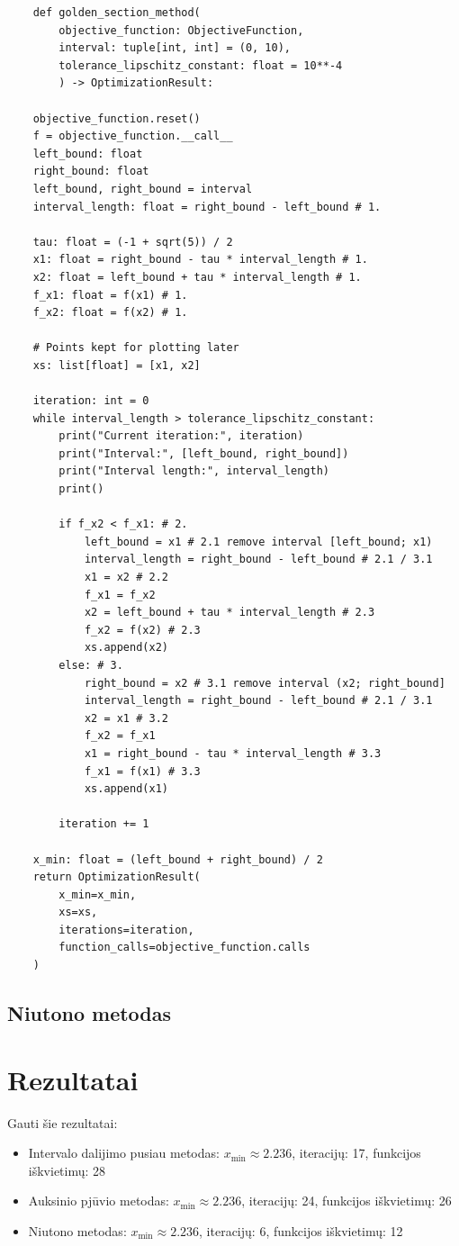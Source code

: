 \documentclass[lithuanian,a4paper,12pt]{article}
\begin{document}
\begin{verbatim}
    def golden_section_method(
        objective_function: ObjectiveFunction, 
        interval: tuple[int, int] = (0, 10), 
        tolerance_lipschitz_constant: float = 10**-4
        ) -> OptimizationResult:
    
    objective_function.reset()
    f = objective_function.__call__
    left_bound: float 
    right_bound: float 
    left_bound, right_bound = interval
    interval_length: float = right_bound - left_bound # 1.
    
    tau: float = (-1 + sqrt(5)) / 2
    x1: float = right_bound - tau * interval_length # 1.
    x2: float = left_bound + tau * interval_length # 1.
    f_x1: float = f(x1) # 1.
    f_x2: float = f(x2) # 1.

    # Points kept for plotting later
    xs: list[float] = [x1, x2]
    
    iteration: int = 0
    while interval_length > tolerance_lipschitz_constant:
        print("Current iteration:", iteration)
        print("Interval:", [left_bound, right_bound])
        print("Interval length:", interval_length)
        print()
        
        if f_x2 < f_x1: # 2.
            left_bound = x1 # 2.1 remove interval [left_bound; x1)
            interval_length = right_bound - left_bound # 2.1 / 3.1
            x1 = x2 # 2.2
            f_x1 = f_x2
            x2 = left_bound + tau * interval_length # 2.3
            f_x2 = f(x2) # 2.3
            xs.append(x2)
        else: # 3.
            right_bound = x2 # 3.1 remove interval (x2; right_bound]
            interval_length = right_bound - left_bound # 2.1 / 3.1
            x2 = x1 # 3.2
            f_x2 = f_x1
            x1 = right_bound - tau * interval_length # 3.3
            f_x1 = f(x1) # 3.3
            xs.append(x1)
            
        iteration += 1
        
    x_min: float = (left_bound + right_bound) / 2
    return OptimizationResult(
        x_min=x_min, 
        xs=xs, 
        iterations=iteration, 
        function_calls=objective_function.calls
    )
\end{verbatim}
\pagebreak

\subsection{Niutono metodas}


\section{Rezultatai}
Gauti šie rezultatai:
\begin{itemize}
    \item Intervalo dalijimo pusiau metodas: 
        $x_{\min} \approx 2.236$, iteracijų: 17, funkcijos iškvietimų: 28
    \item Auksinio pjūvio metodas:
        $x_{\min} \approx 2.236$, iteracijų: 24, funkcijos iškvietimų: 26
    \item Niutono metodas:
        $x_{\min} \approx 2.236$, iteracijų: 6, funkcijos iškvietimų: 12
\end{itemize}
\end{document}
